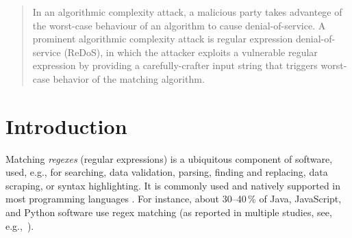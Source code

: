 \documentclass[acmsmall,screen]{acmart}
\begin{document}
\begin{abstract} 
In an  algorithmic complexity attack, a malicious party takes advantege of the worst-case behaviour of an algorithm to cause denial-of-service.
%
A prominent algorithmic complexity attack is regular expression denial-of-service (ReDoS), in which the attacker exploits a vulnerable regular expression by providing a carefully-crafter input string that triggers worst-case behavior of the matching algorithm.
%

\end{abstract}

\maketitle




\section{Introduction}\label{sec:intro}

Matching \emph{regexes} (regular expressions) is a ubiquitous component of software, 
used, e.g., for searching, data validation, parsing, finding and replacing, data
scraping, or syntax highlighting. It is commonly used and natively supported in most programming languages \cite{regexwiki}.
For instance, about 30--40\,\% of Java, JavaScript, and Python software use
regex matching (as reported in multiple studies, see, e.g.,~\cite{rethinkingregexes}).
\end{document}
